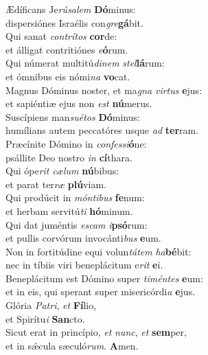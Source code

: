 \evenverse Ædíficans Je\textit{rú}\textit{sa}\textit{lem} \textbf{Dó}minus:~\*\\
\evenverse dispersiónes Israélis con\textit{gre}\textbf{gá}bit.\\
\oddverse Qui sanat \textit{con}\textit{trí}\textit{tos} \textbf{cor}de:~\*\\
\oddverse et álligat contritiónes \textit{e}\textbf{ó}rum.\\
\evenverse Qui númerat multitú\textit{di}\textit{nem} \textit{stel}\textbf{lá}rum:~\*\\
\evenverse et ómnibus eis nómi\textit{na} \textbf{vo}cat.\\
\oddverse Magnus Dóminus noster, et ma\textit{gna} \textit{vir}\textit{tus} \textbf{e}jus:~\*\\
\oddverse et sapiéntiæ ejus non \textit{est} \textbf{nú}merus.\\
\evenverse Suscípiens man\textit{su}\textit{é}\textit{tos} \textbf{Dó}minus:~\*\\
\evenverse humílians autem peccatóres usque \textit{ad} \textbf{ter}ram.\\
\oddverse Præcínite Dómino in \textit{con}\textit{fes}\textit{si}\textbf{ó}ne:~\*\\
\oddverse psállite Deo nostro \textit{in} \textbf{cí}thara.\\
\evenverse Qui ópe\textit{rit} \textit{cæ}\textit{lum} \textbf{nú}bibus:~\*\\
\evenverse et parat ter\textit{ræ} \textbf{plú}viam.\\
\oddverse Qui prodúcit in \textit{món}\textit{ti}\textit{bus} \textbf{fe}num:~\*\\
\oddverse et herbam servitú\textit{ti} \textbf{hó}minum.\\
\evenverse Qui dat juméntis \textit{e}\textit{scam} \textit{i}\textbf{psó}rum:~\*\\
\evenverse et pullis corvórum invocánti\textit{bus} \textbf{e}um.\\
\oddverse Non in fortitúdine equi volun\textit{tá}\textit{tem} \textit{ha}\textbf{bé}bit:~\*\\
\oddverse nec in tíbiis viri beneplácitum e\textit{rit} \textbf{e}i.\\
\evenverse Beneplácitum est Dómino super \textit{ti}\textit{mén}\textit{tes} \textbf{e}um:~\*\\
\evenverse et in eis, qui sperant super misericórdi\textit{a} \textbf{e}jus.\\
\oddverse Glória \textit{Pa}\textit{tri}, \textit{et} \textbf{Fí}lio,~\*\\
\oddverse et Spirítu\textit{i} \textbf{San}cto.\\
\evenverse Sicut erat in princípio, \textit{et} \textit{nunc}, \textit{et} \textbf{sem}per,~\*\\
\evenverse et in sǽcula sæculó\textit{rum}. \textbf{A}men.\\
